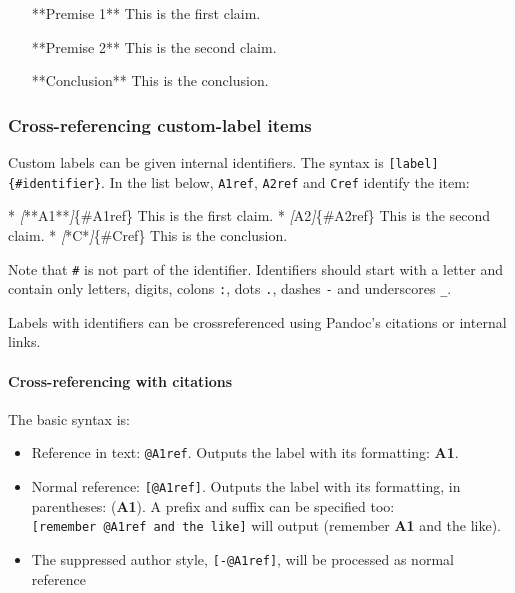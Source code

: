 \documentclass[
]{article}
\newenvironment{Shaded}{}{}
\newcommand{\CommentTok}[1]{\textcolor[rgb]{0.38,0.63,0.69}{\textit{#1}}}
\newcommand{\NormalTok}[1]{#1}
\newcommand{\OtherTok}[1]{\textcolor[rgb]{0.00,0.44,0.13}{#1}}
\newcommand{\SpecialStringTok}[1]{\textcolor[rgb]{0.73,0.40,0.53}{#1}}
\providecommand{\tightlist}{%
  \setlength{\itemsep}{0pt}\setlength{\parskip}{0pt}}
\begin{document}
\begin{itemize}
\tightlist

\item[**Premise 1**] This is the first claim.

\item[**Premise 2**] This is the second claim.

\item[**Conclusion**] This is the conclusion.

\end{itemize}

\hypertarget{cross-referencing-custom-label-items}{%
\subsubsection{Cross-referencing custom-label
items}\label{cross-referencing-custom-label-items}}

Custom labels can be given internal identifiers. The syntax is
\texttt{{[}label{]}\{\#identifier\}}. In the list below, \texttt{A1ref},
\texttt{A2ref} and \texttt{Cref} identify the item:

\begin{Shaded}
\begin{Highlighting}[]
\SpecialStringTok{* }\CommentTok{[}\OtherTok{**A1**}\CommentTok{]}\NormalTok{\{\#A1ref\} This is the first claim.}
\SpecialStringTok{* }\CommentTok{[}\OtherTok{A2}\CommentTok{]}\NormalTok{\{\#A2ref\} This is the second claim.}
\SpecialStringTok{* }\CommentTok{[}\OtherTok{*C*}\CommentTok{]}\NormalTok{\{\#Cref\} This is the conclusion.}
\end{Highlighting}
\end{Shaded}

Note that \texttt{\#} is not part of the identifier. Identifiers should
start with a letter and contain only letters, digits, colons \texttt{:},
dots \texttt{.}, dashes \texttt{-} and underscores \texttt{\_}.

Labels with identifiers can be crossreferenced using Pandoc's citations
or internal links.

\hypertarget{cross-referencing-with-citations}{%
\paragraph{Cross-referencing with
citations}\label{cross-referencing-with-citations}}

The basic syntax is:

\begin{itemize}
\tightlist
\item
  Reference in text: \texttt{@A1ref}. Outputs the label with its
  formatting: \textbf{A1}.
\item
  Normal reference: \texttt{{[}@A1ref{]}}. Outputs the label with its
  formatting, in parentheses: (\textbf{A1}). A prefix and suffix can be
  specified too: \texttt{{[}remember\ @A1ref\ and\ the\ like{]}} will
  output (remember \textbf{A1} and the like).
\item
  The suppressed author style, \texttt{{[}-@A1ref{]}}, will be processed
  as normal reference
\end{itemize}
\end{document}
